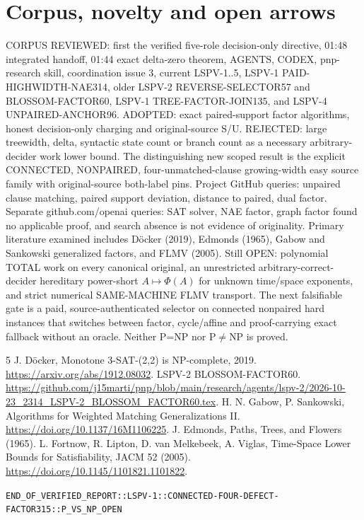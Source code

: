 \documentclass[11pt]{article}
\begin{document}
\section{Corpus, novelty and open arrows}
CORPUS REVIEWED: first the verified five-role decision-only directive, 01:48 integrated handoff, 01:44 exact delta-zero theorem, AGENTS, CODEX, pnp-research skill, coordination issue 3, current LSPV-1..5, LSPV-1 PAID-HIGHWIDTH-NAE314, older LSPV-2 REVERSE-SELECTOR57 and BLOSSOM-FACTOR60, LSPV-1 TREE-FACTOR-JOIN135, and LSPV-4 UNPAIRED-ANCHOR96. ADOPTED: exact paired-support factor algorithms, honest decision-only charging and original-source S/U. REJECTED: large treewidth, delta, syntactic state count or branch count as a necessary arbitrary-decider work lower bound. The distinguishing new scoped result is the explicit CONNECTED, NONPAIRED, four-unmatched-clause growing-width easy source family with original-source both-label pins. Project GitHub queries: unpaired clause matching, paired support deviation, distance to paired, dual factor. Separate github.com/openai queries: SAT solver, NAE factor, graph factor found no applicable proof, and search absence is not evidence of originality. Primary literature examined includes D\"ocker (2019), Edmonds (1965), Gabow and Sankowski generalized factors, and FLMV (2005).
Still OPEN: polynomial TOTAL work on every canonical original, an unrestricted arbitrary-correct-decider hereditary power-short $A\mapsto\Phi(A)$ for unknown time/space exponents, and strict numerical SAME-MACHINE FLMV transport. The next falsifiable gate is a paid, source-authenticated selector on connected nonpaired hard instances that switches between factor, cycle/affine and proof-carrying exact fallback without an oracle. Neither P=NP nor P$\ne$NP is proved.
\begin{thebibliography}{5}
 J. D\"ocker, Monotone 3-SAT-(2,2) is NP-complete, 2019. \url{https://arxiv.org/abs/1912.08032}.
 LSPV-2 BLOSSOM-FACTOR60. \url{https://github.com/j15marti/pnp/blob/main/research/agents/lspv-2/2026-10-23_2314_LSPV-2_BLOSSOM_FACTOR60.tex}.
 H. N. Gabow, P. Sankowski, Algorithms for Weighted Matching Generalizations II. \url{https://doi.org/10.1137/16M1106225}.
 J. Edmonds, Paths, Trees, and Flowers (1965).
 L. Fortnow, R. Lipton, D. van Melkebeek, A. Viglas, Time-Space Lower Bounds for Satisfiability, JACM 52 (2005). \url{https://doi.org/10.1145/1101821.1101822}.
\end{thebibliography}
\noindent\texttt{END\_OF\_VERIFIED\_REPORT::LSPV-1::CONNECTED-FOUR-DEFECT-FACTOR315::P\_VS\_NP\_OPEN}
\end{document}

